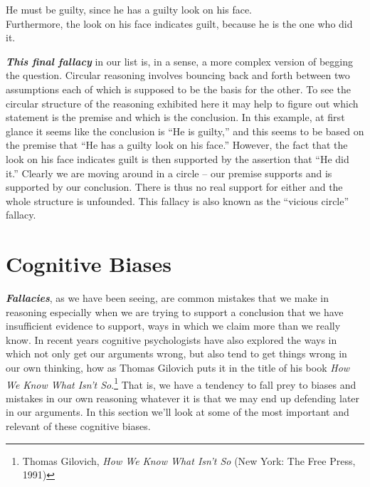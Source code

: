 \documentclass[
  12pt, openany]{book}
\theoremstyle{definition}
\theoremstyle{definition}
\theoremstyle{definition}
\theoremstyle{definition}
\theoremstyle{remark}
\begin{document}
\begin{center}

\begin{argument}
He must be guilty, since he has a guilty look on his face.\\

Furthermore, the look on his face indicates guilt, because he is the one who did it.

\end{argument}


\end{center}

\textbf{\emph{This final fallacy}} in our list is, in a sense, a more complex version of begging the question. Circular reasoning involves bouncing back and forth between two assumptions each of which is supposed to be the basis for the other. To see the circular structure of the reasoning exhibited here it may help to figure out which statement is the premise and which is the conclusion. In this example, at first glance it seems like the conclusion is ``He is guilty,'' and this seems to be based on the premise that ``He has a guilty look on his face.'' However, the fact that the look on his face indicates guilt is then supported by the assertion that ``He did it.'' Clearly we are moving around in a circle -- our premise supports and is supported by our conclusion. There is thus no real support for either and the whole structure is unfounded. This fallacy is also known as the ``vicious circle'' fallacy.

\hypertarget{cognitive-biases}{%
\section{Cognitive Biases}\label{cognitive-biases}}

\textbf{\emph{Fallacies}}, as we have been seeing, are common mistakes that we make in reasoning especially when we are trying to support a conclusion that we have insufficient evidence to support, ways in which we claim more than we really know. In recent years cognitive psychologists have also explored the ways in which not only get our arguments wrong, but also tend to get things wrong in our own thinking, how as Thomas Gilovich puts it in the title of his book \emph{How We Know What Isn't So}.\footnote{Thomas Gilovich, \emph{How We Know What Isn't So} (New York: The Free Press, 1991)} That is, we have a tendency to fall prey to biases and mistakes in our own reasoning whatever it is that we may end up defending later in our arguments. In this section we'll look at some of the most important and relevant of these cognitive biases.
\end{document}
